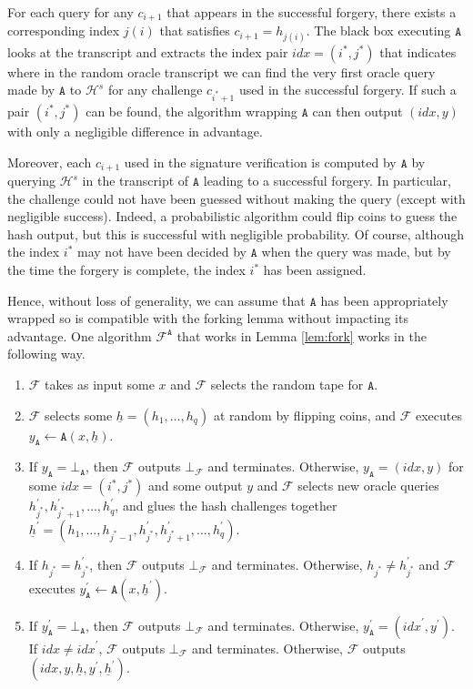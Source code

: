\documentclass{mrl}
\theoremstyle{plain}
\theoremstyle{definition}
\begin{document}
For each query for any $c_{i+1}$ that appears in the successful forgery, there exists a corresponding index $j(i)$ that satisfies $c_{i+1} = h_{j(i)}$. The black box executing $\texttt{A}$ looks at the transcript and extracts the index pair $\textit{idx} = (i^*, j^*)$ that indicates where in the random oracle transcript we can find the very first oracle query made by $\texttt{A}$ to $\mathcal{H}^s$ for any challenge $c_{i^*+1}$ used in the successful forgery. If such a pair $(i^*, j^*)$ can be found, the algorithm wrapping $\texttt{A}$ can then output $(\textit{idx}, y)$ with only a negligible difference in advantage. 

Moreover, each $c_{i+1}$ used in the signature verification is computed by $\texttt{A}$ by querying $\mathcal{H}^s$  in the transcript of $\texttt{A}$ leading to a successful forgery. In particular, the challenge could not have been guessed without making the query (except with negligible success). Indeed, a probabilistic algorithm could flip coins to guess the hash output, but this is successful with negligible probability. Of course, although the index $i^*$ may not have been decided by $\texttt{A}$ when the query was made, but by the time the forgery is complete, the index $i^*$ has been assigned.

Hence, without loss of generality, we can assume that $\texttt{A}$ has been appropriately wrapped so is compatible with the forking lemma without impacting its advantage. One algorithm $\mathcal{F}^\texttt{A}$ that works in Lemma \ref{lem:fork} works in the following way.

\begin{enumerate}
\item $\mathcal{F}$ takes as input some $x$ and $\mathcal{F}$ selects the random tape for $\texttt{A}$.
\item $\mathcal{F}$ selects some $\underline{h} = (h_1, \ldots, h_q)$ at random by flipping coins, and $\mathcal{F}$ executes $y_\texttt{A} \leftarrow \texttt{A}(x,\underline{h})$.
\item If $y_{\texttt{A}} = \bot_{\texttt{A}}$, then $\mathcal{F}$ outputs $\bot_{\mathcal{F}}$ and terminates. Otherwise, $y_{\texttt{A}} = (\textit{idx}, y)$ for some $\textit{idx}=(i^*,j^*)$ and some output $y$ and $\mathcal{F}$ selects new oracle queries $h_{j^*}^\prime, h_{j^*+1}^\prime, \ldots, h_q^\prime$, and glues the hash challenges together $\underline{h}^\prime = (h_1, \ldots, h_{j^*-1}, h_{j^*}^\prime, h_{j^*+1}^\prime, \ldots, h_q^\prime)$. 
\item If $h_{j^*} = h_{j^{*}}^\prime$, then $\mathcal{F}$ outputs $\bot_{\mathcal{F}}$ and terminates. Otherwise, $h_{j^*} \neq h_{j^{*}}^\prime$ and $\mathcal{F}$ executes $y_\texttt{A}^\prime \leftarrow \texttt{A}(x,\underline{h}^\prime)$.
\item If $y_{\texttt{A}}^\prime = \bot_{\texttt{A}}$, then $\mathcal{F}$ outputs $\bot_{\mathcal{F}}$ and terminates. Otherwise, $y_{\texttt{A}}^\prime = (\textit{idx}^{\prime}, y^\prime)$. If $\textit{idx} \neq \textit{idx}^\prime$, $\mathcal{F}$ outputs $\bot_{\mathcal{F}}$ and terminates. Otherwise, $\mathcal{F}$ outputs $(\textit{idx}, y, \underline{h}, y^\prime, \underline{h}^\prime)$.
\end{enumerate}
\end{document}
